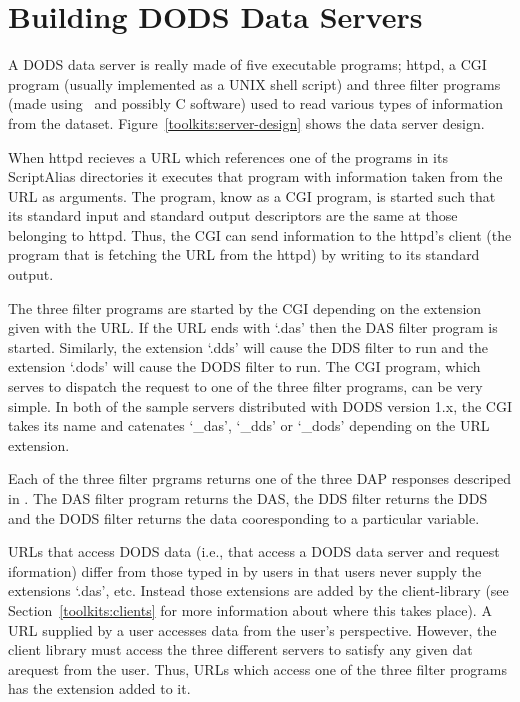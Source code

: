 \section{Building DODS Data Servers}
\label{toolkits:servers}

A DODS data server is really made of five executable programs; httpd, a CGI
program (usually implemented as a UNIX shell script) and three filter
programs (made using \Cpp\ and possibly C software) used to read various
types of information from the dataset. Figure~\ref{toolkits:server-design}
shows the data server design. 

When httpd recieves a URL which references one of the programs in its
ScriptAlias directories it executes that program with information taken from
the URL as arguments\cite{httpd:cgi}. The program, know as a CGI program, is
started such that its standard input and standard output descriptors are the
same at those belonging to httpd. Thus, the CGI can send information to the
httpd's client (the program that is fetching the URL from the httpd) by
writing to its standard output. 

The three filter programs are started by the CGI depending on the extension
given with the URL. If the URL ends with `.das' then the DAS filter program is
started. Similarly, the extension `.dds' will cause the DDS filter to run and
the extension `.dods' will cause the DODS filter to run. The CGI program,
which serves to dispatch the request to one of the three filter programs, can
be very simple. In both of the sample servers distributed with DODS version
1.x, the CGI takes its name and catenates `_das', `_dds' or `_dods' depending
on the URL extension.

Each of the three filter prgrams returns one of the three DAP responses
descriped in \DAP. The DAS filter program returns the DAS, the DDS filter
returns the DDS and the DODS filter returns the data cooresponding to a
particular variable. 

URLs that access DODS data (i.e., that access a DODS data server and request
iformation) differ from those typed in by users in that users never supply
the extensions `.das', etc. Instead those extensions are added by the
client-library (see Section~\ref{toolkits:clients} for more information about
where this takes place). A URL supplied by a user accesses data from the
user's perspective. However, the client library must access the three
different servers to satisfy any given dat arequest from the user. Thus, URLs
which access one of the three filter programs has the extension added to it.

